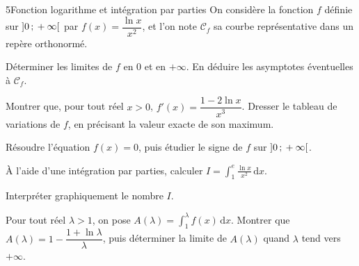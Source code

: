 \begin{exoBac}{5}{Fonction logarithme et intégration par parties}
On considère la fonction $f$ définie sur $\mathopen{]}0\,{;}\,+\infty\mathclose{[}$ par $f(x)=\dfrac{\ln x}{x^{2}}$, et l'on note $\mathcal{C}_f$ sa courbe
représentative dans un repère orthonormé.
\begin{questions}
  \item Déterminer les limites de $f$ en $0$ et en $+\infty$. En déduire les asymptotes éventuelles à $\mathcal{C}_f$.
  \item Montrer que, pour tout réel $x>0$, $f'(x)=\dfrac{1-2\ln x}{x^{3}}$. Dresser le tableau de variations de $f$, en précisant la
    valeur exacte de son maximum.
  \item Résoudre l'équation $f(x)=0$, puis étudier le signe de $f$ sur $\mathopen{]}0\,{;}\,+\infty\mathclose{[}$.
\end{questions}
\begin{questions}[resume]
  \item À l'aide d'une intégration par parties, calculer $I=\displaystyle\int_1^{e}\frac{\ln x}{x^{2}}\,\mathrm{d}x$.
  \item Interpréter graphiquement le nombre $I$.
  \item Pour tout réel $\lambda>1$, on pose $A(\lambda)=\displaystyle\int_1^{\lambda}f(x)\,\mathrm{d}x$. Montrer que
    $A(\lambda)=1-\dfrac{1+\ln\lambda}{\lambda}$, puis déterminer la limite de $A(\lambda)$ quand $\lambda$ tend vers $+\infty$.
\end{questions}
\end{exoBac}
